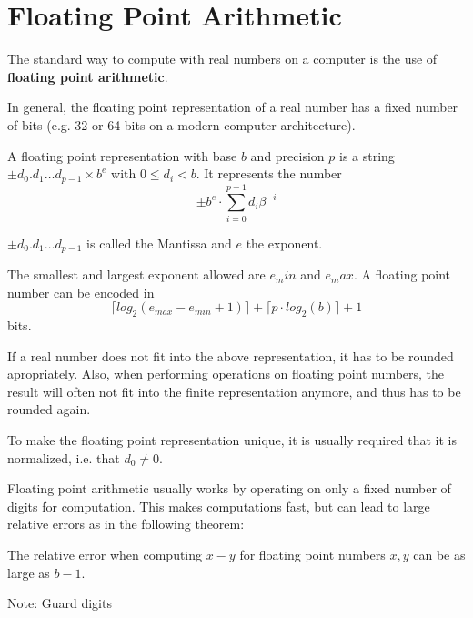 \section{Floating Point Arithmetic}
The standard way to compute with real numbers on a computer is the use 
of \textbf{floating point arithmetic}. 

In general, the floating point representation of a real number has a fixed
number of bits (e.g. 32 or 64 bits on a modern computer architecture).
\begin{definition}\label{def: floating point number}
	A floating point representation with base $b$ and precision $p$
	is a string $\pm d_0 . d_1 \dots d_{p-1} \times b^e$ with $0 \leq d_i < b$.	
	It represents the number
	$$ \pm b^e \cdot \sum_{i=0}^{p-1} d_i\beta^{-i} $$ 

	$\pm d_0 . d_1 \dots d_{p-1}$ is called the Mantissa and $e$ the exponent.
	
	The smallest and largest exponent allowed are $e_min$ and $e_max$.
	A floating point number can be encoded in
	$$ \lceil log_2(e_{max}-e_{min}+1) \rceil + \lceil  p \cdot log_2 (b) \rceil + 1 $$
	bits.
\end{definition}
If a real number does not fit into the above representation, it has to be
rounded apropriately.
Also, when performing operations on floating point
numbers, the result will often not fit into the finite representation anymore,
and thus has to be rounded again. 

To make the floating point representation unique,
it is usually required that it is normalized, i.e. that $d_0 \neq 0$. 

Floating point arithmetic usually works by
operating on
only a fixed number of digits for computation.
This makes computations fast, but can lead to large relative errors as in the following theorem: 
\begin{theorem}
	The relative error when computing $x-y$ for floating point numbers $x,y$ can be as large as $b-1$. 
\end{theorem}
Note: Guard digits
